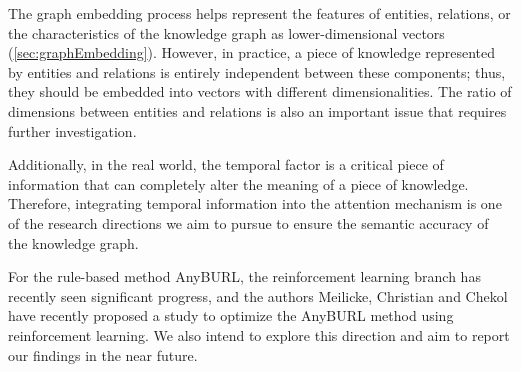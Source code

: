 The graph embedding process helps represent the features of entities, relations, or the characteristics of the knowledge graph as lower-dimensional vectors (\autoref{sec:graphEmbedding}). However, in practice, a piece of knowledge represented by entities and relations is entirely independent between these components; thus, they should be embedded into vectors with different dimensionalities. The ratio of dimensions between entities and relations is also an important issue that requires further investigation. 

Additionally, in the real world, the temporal factor is a critical piece of information that can completely alter the meaning of a piece of knowledge. Therefore, integrating temporal information into the attention mechanism is one of the research directions we aim to pursue to ensure the semantic accuracy of the knowledge graph.

For the rule-based method AnyBURL, the reinforcement learning branch has recently seen significant progress, and the authors Meilicke, Christian and Chekol \cite{meilicke2020reinforced} have recently proposed a study to optimize the AnyBURL method using reinforcement learning. We also intend to explore this direction and aim to report our findings in the near future.



%


